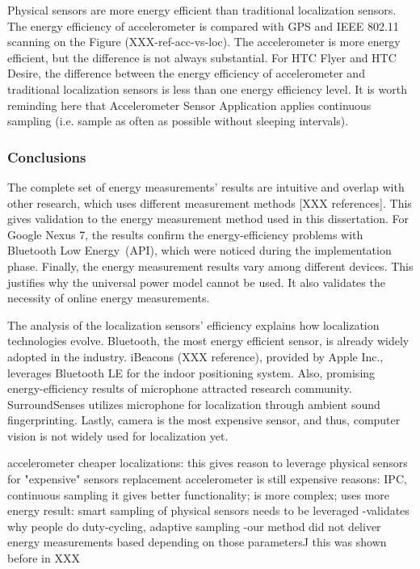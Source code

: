 
Physical sensors are more energy efficient than traditional localization sensors. The energy efficiency of accelerometer is compared with GPS and IEEE 802.11 scanning on the Figure (XXX-ref-acc-vs-loc). The accelerometer is more energy efficient, but the difference is not always substantial. For HTC Flyer and HTC Desire, the difference between the energy efficiency of accelerometer and traditional localization sensors is less than one energy efficiency level. It is worth reminding here that Accelerometer Sensor Application applies continuous sampling (i.e. sample as often as possible without sleeping intervals).
	


\subsubsection{Conclusions}
The complete set of energy measurements' results are intuitive and overlap with other research, which uses different measurement methods [XXX references]. This gives validation to the energy measurement method used in this dissertation. For Google Nexus 7, the results confirm the energy-efficiency problems with Bluetooth Low Energy\ (API), which were noticed during the implementation phase. Finally, the energy measurement results vary among different devices. This justifies why the universal power model cannot be used. It also validates the necessity of online energy measurements. 

The analysis of the localization sensors' efficiency explains how localization technologies evolve. Bluetooth, the most energy efficient sensor, is already widely adopted in the industry. iBeacons (XXX reference), provided by Apple Inc.,  leverages Bluetooth LE for the indoor positioning system. Also, promising energy-efficiency results of microphone attracted research community. SurroundSenses \cite{azizyan:surroundsense} utilizes microphone for localization through ambient sound fingerprinting. Lastly, camera is the most expensive sensor, and thus, computer vision is not widely used for localization yet.
		
accelerometer cheaper localizations:
	this gives reason to leverage physical sensors for "expensive" sensors replacement
	accelerometer is still expensive
		reasons: IPC, continuous sampling
			it gives better functionality; is more complex; uses more energy
		result: smart sampling of physical sensors needs to be leveraged
			-validates why people do duty-cycling, adaptive sampling
			-our method did not deliver energy measurements based depending on those parameters^^
		this was shown before in XXX
		
